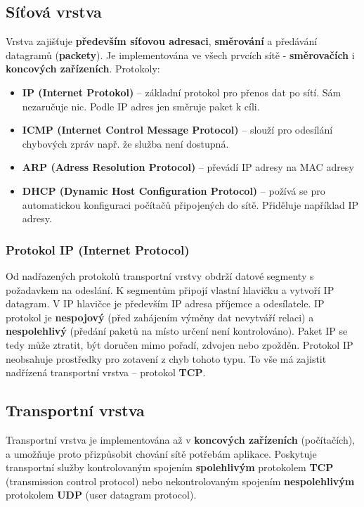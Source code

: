 \subsection{Síťová vrstva}
Vrstva zajišťuje \textbf{především síťovou adresaci}, \textbf{směrování} a předávání datagramů (\textbf{packety}). Je implementována ve všech prvcích sítě - \textbf{směrovačích} i \textbf{koncových zařízeních}. Protokoly:
\begin{itemize}
\item \textbf{IP (Internet Protokol)} -- základní protokol pro přenos dat po sítí. Sám nezaručuje nic. Podle IP adres jen směruje paket k cíli.
\item \textbf{ICMP (Internet Control Message Protocol)} -- slouží pro odesílání chybových zpráv např. že služba není dostupná.
\item \textbf{ARP (Adress Resolution Protocol)} -- převádí IP adresy na MAC adresy
\item \textbf{DHCP (Dynamic Host Configuration Protocol)} -- požívá se pro automatickou konfiguraci počítačů připojených do sítě. Přiděluje například IP adresy.
\end{itemize}

\subsubsection{Protokol IP (Internet Protocol)}
Od nadřazených protokolů transportní vrstvy obdrží datové segmenty s požadavkem na odeslání. K segmentům připojí vlastní hlavičku a vytvoří IP datagram. V IP hlavičce je především IP adresa příjemce a odesílatele. IP protokol je \textbf{nespojový} (před zahájením výměny dat nevytváří relaci) a \textbf{nespolehlivý} (předání paketů na místo určení není kontrolováno). Paket IP se tedy může ztratit, být doručen mimo pořadí, zdvojen nebo zpožděn. Protokol IP neobsahuje prostředky pro zotavení z chyb tohoto typu. To vše má zajistit nadřízená transportní vrstva – protokol \textbf{TCP}.

\subsection{Transportní vrstva}
Transportní vrstva je implementována až v \textbf{koncových zařízeních} (počítačích), a umožňuje proto přizpůsobit chování sítě potřebám aplikace. Poskytuje transportní služby kontrolovaným spojením \textbf{spolehlivým} protokolem \textbf{TCP} (transmission control protocol) nebo nekontrolovaným spojením \textbf{nespolehlivým} protokolem \textbf{UDP} (user datagram protocol).

